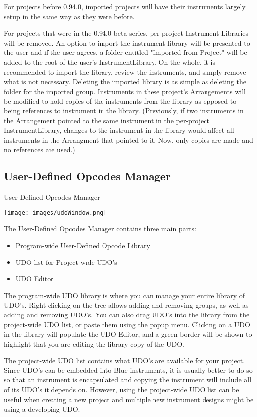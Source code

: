 For projects before 0.94.0, imported projects will have their
instruments largely setup in the same way as they were before.

For projects that were in the 0.94.0 beta series, per-project Instrument
Libraries will be removed. An option to import the instrument library
will be presented to the user and if the user agrees, a folder entitled
"Imported from Project" will be added to the root of the user's
InstrumentLibrary. On the whole, it is recommended to import the
library, review the instruments, and simply remove what is not
necessary. Deleting the imported library is as simple as deleting the
folder for the imported group. Instruments in these project's
Arrangements will be modified to hold copies of the instruments from the
library as opposed to being references to instrument in the library.
(Previously, if two instruments in the Arrangement pointed to the same
instrument in the per-project InstrumentLibrary, changes to the
instrument in the library would affect all instruments in the Arrangment
that pointed to it. Now, only copies are made and no references are
used.)

\subsection{User-Defined Opcodes Manager}\label{udoManager}

User-Defined Opcodes Manager

\texttt{[image: images/udoWindow.png]}

The User-Defined Opcodes Manager contains three main parts:

\begin{itemize}
\tightlist
\item
  Program-wide User-Defined Opcode Library
\item
  UDO list for Project-wide UDO's
\item
  UDO Editor
\end{itemize}

The program-wide UDO library is where you can manage your entire library
of UDO's. Right-clicking on the tree allows adding and removing groups,
as well as adding and removing UDO's. You can also drag UDO's into the
library from the project-wide UDO list, or paste them using the popup
menu. Clicking on a UDO in the library will populate the UDO Editor, and
a green border will be shown to highlight that you are editing the
library copy of the UDO.

The project-wide UDO list contains what UDO's are available for your
project. Since UDO's can be embedded into Blue instruments, it is
usually better to do so so that an instrument is encapsulated and
copying the instrument will include all of its UDO's it depends on.
However, using the project-wide UDO list can be useful when creating a
new project and multiple new instrument designs might be using a
developing UDO.

